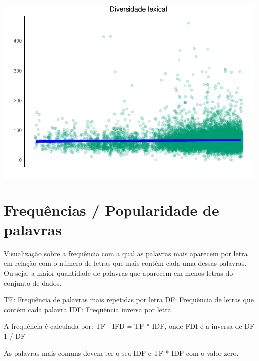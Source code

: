 \documentclass[]{article}
\newenvironment{Shaded}{\begin{snugshade}}{\end{snugshade}}
\newcommand{\DataTypeTok}[1]{\textcolor[rgb]{0.13,0.29,0.53}{#1}}
\newcommand{\DecValTok}[1]{\textcolor[rgb]{0.00,0.00,0.81}{#1}}
\newcommand{\KeywordTok}[1]{\textcolor[rgb]{0.13,0.29,0.53}{\textbf{#1}}}
\newcommand{\NormalTok}[1]{#1}
\newcommand{\OperatorTok}[1]{\textcolor[rgb]{0.81,0.36,0.00}{\textbf{#1}}}
\newcommand{\OtherTok}[1]{\textcolor[rgb]{0.56,0.35,0.01}{#1}}
\newcommand{\StringTok}[1]{\textcolor[rgb]{0.31,0.60,0.02}{#1}}
\begin{document}
\includegraphics{avaliacaoLetrasDeForro_files/figure-latex/unnamed-chunk-9-2.pdf}

\hypertarget{frequencias-popularidade-de-palavras}{%
\section{Frequências / Popularidade de
palavras}\label{frequencias-popularidade-de-palavras}}

Visualização sobre a frequência com a qual as palavras mais aparecem por
letra em relação com o número de letras que mais contém cada uma dessas
palavras. Ou seja, a maior quantidade de palavras que aparecem em menos
letras do conjunto de dados.

TF: Frequência de palavras mais repetidas por letra DF: Frequência de
letras que contém cada palavra IDF: Frequência inversa por letra

A frequência é calculada por: TF - IFD = TF * IDF, onde FDI é a inversa
de DF 1 / DF

As palavras mais comuns devem ter o seu IDF e TF * IDF com o valor zero.

\begin{Shaded}
\end{Shaded}
\end{document}
